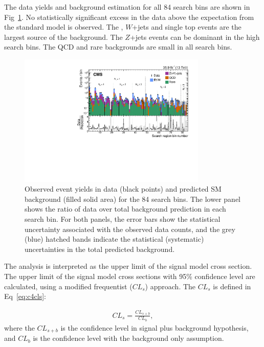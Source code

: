 The data yields and background estimation for all 84 search bins are shown in Fig~\ref{fig:84sbunblind}. No statistically significant excess in the data above the expectation from the standard model is observed. The \ttbar, $W$+jets and single top events are the largest source of the background. The $Z$+jets events can be dominant in the high \MET search bins. The QCD and rare backgrounds are small in all search bins. 

\begin{figure}[htbp]
 \begin{center}
  \includegraphics[width=0.8\textwidth]{sections/mc4/Results/figures/UnblindPlots.pdf}
 \end{center}
 \caption{Observed event yields in data (black points) and predicted SM background (filled solid area) for the 84 search bins. The lower panel shows the ratio of data over total background prediction in each search bin. For both panels, the error bars show the statistical uncertainty associated with the observed data counts, and the grey (blue) hatched bands indicate the statistical (systematic) uncertainties in the total predicted background.}
 \label{fig:84sbunblind}
\end{figure}

The analysis is interpreted as the upper limit of the signal model cross section. The upper limit of the signal model cross sections with 95\% confidence level are calculated, using a modified frequentist ($CL_{s}$) approach\cite{Cowan:2010js}. The $CL_{s}$ is defined in Eq~\ref{eq:c4cls}:

\begin{equation}
 \begin{aligned}
  CL_{s}=\frac{CL_{s+b}}{CL_{b}},
 \end{aligned}
 \label{eq:c4cls}
\end{equation}
where the $CL_{s+b}$ is the confidence level in signal plus background hypothesis, and $CL_{b}$ is the confidence level with the background only assumption. 


